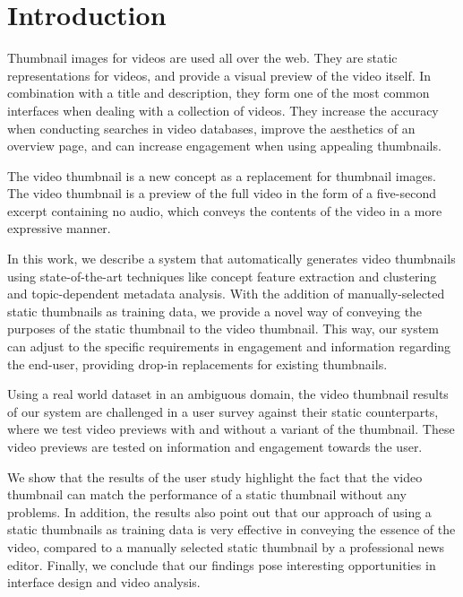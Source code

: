 \documentclass{../resources/sig-alternate-05-2015}
\begin{document}

\printccsdesc


\section{Introduction}
\label{introduction}
Thumbnail images for videos are used all over the web. They are static representations for videos, and provide a visual preview of the video itself. In combination with a title and description, they form one of the most common interfaces when dealing with a collection of videos. They increase the accuracy when conducting searches in video databases, improve the aesthetics of an overview page, and can increase engagement when using appealing thumbnails.

The video thumbnail is a new concept as a replacement for thumbnail images. The video thumbnail is a preview of the full video in the form of a five-second excerpt containing no audio, which conveys the contents of the video in a more expressive manner.

In this work, we describe a system that automatically generates video thumbnails using state-of-the-art techniques like concept feature extraction and clustering and topic-dependent metadata analysis. With the addition of manually-selected static thumbnails as training data, we provide a novel way of conveying the purposes of the static thumbnail to the video thumbnail. This way, our system can adjust to the specific requirements in engagement and information regarding the end-user, providing drop-in replacements for existing thumbnails.

Using a real world dataset in an ambiguous domain, the video thumbnail results of our system are challenged in a user survey against their static counterparts, where we test video previews with and without a variant of the thumbnail. These video previews are tested on information and engagement towards the user.

We show that the results of the user study highlight the fact that the video thumbnail can match the performance of a static thumbnail without any problems. In addition, the results also point out that our approach of using a static thumbnails as training data is very effective in conveying the essence of the video, compared to a manually selected static thumbnail by a professional news editor. Finally, we conclude that our findings pose interesting opportunities in interface design and video analysis.
\end{document}
